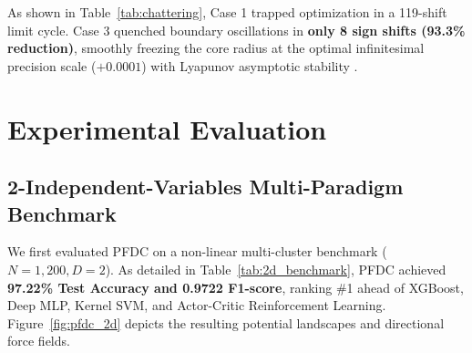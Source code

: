 \documentclass[11pt,a4paper]{article}
\begin{document}
As shown in Table~\ref{tab:chattering}, Case 1 trapped optimization in a 119-shift limit cycle. Case 3 quenched boundary oscillations in \textbf{only 8 sign shifts (93.3\% reduction)}, smoothly freezing the core radius at the optimal infinitesimal precision scale ($+0.0001$) with Lyapunov asymptotic stability \cite{robbins1951stochastic}.

\begin{table}[h]
\centering
\small
\caption{Dynamic Learning Rate Optimization Regimes on Radial Parameters.}
\label{tab:chattering}
\end{table}

\section{Experimental Evaluation}

\subsection{2-Independent-Variables Multi-Paradigm Benchmark}
We first evaluated PFDC on a non-linear multi-cluster benchmark ($N=1,200, D=2$). As detailed in Table~\ref{tab:2d_benchmark}, PFDC achieved \textbf{97.22\% Test Accuracy and 0.9722 F1-score}, ranking \#1 ahead of XGBoost, Deep MLP, Kernel SVM, and Actor-Critic Reinforcement Learning. Figure~\ref{fig:pfdc_2d} depicts the resulting potential landscapes and directional force fields.
\end{document}
